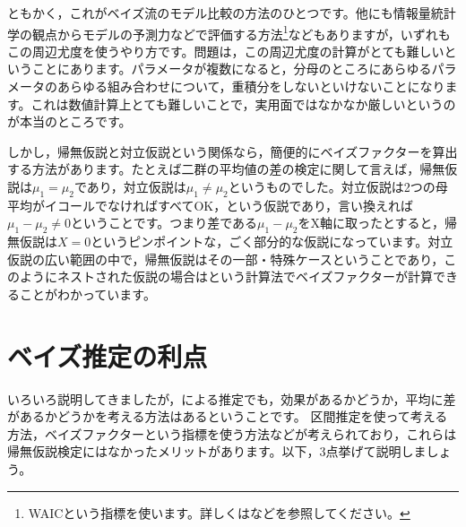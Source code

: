 \documentclass{ltjbook}
\begin{document}
ともかく，これがベイズ流のモデル比較の方法のひとつです。他にも情報量統計学の観点からモデルの予測力などで評価する方法\footnote{WAICという指標を使います。詳しくは\textcite{Hamada201912}などを参照してください。}などもありますが，いずれもこの周辺尤度を使うやり方です。問題は，この周辺尤度の計算がとても難しいということにあります。パラメータが複数になると，分母のところにあらゆるパラメータのあらゆる組み合わせについて，重積分をしないといけないことになります。これは数値計算上とても難しいことで，実用面ではなかなか厳しいというのが本当のところです。

しかし，帰無仮説と対立仮説という関係なら，簡便的にベイズファクターを算出する方法があります。たとえば二群の平均値の差の検定に関して言えば，帰無仮説は$\mu_1=\mu_2$であり，対立仮説は$\mu_1 \neq \mu_2$というものでした。対立仮説は2つの母平均がイコールでなければすべてOK，という仮説であり，言い換えれば$\mu_1-\mu_2\neq 0$ということです。つまり差である$\mu_1-\mu_2$をX軸に取ったとすると，帰無仮説は$X=0$というピンポイントな，ごく部分的な仮説になっています。対立仮説の広い範囲の中で，帰無仮説はその一部・特殊ケースということであり，このようにネストされた仮説の場合は\parencite{Lee201709}という計算法でベイズファクターが計算できることがわかっています。

\section{ベイズ推定の利点}
いろいろ説明してきましたが，による推定でも，効果があるかどうか，平均に差があるかどうかを考える方法はあるということです。
区間推定を使って考える方法，ベイズファクターという指標を使う方法などが考えられており，これらは帰無仮説検定にはなかったメリットがあります。以下，3点挙げて説明しましょう。
\end{document}
